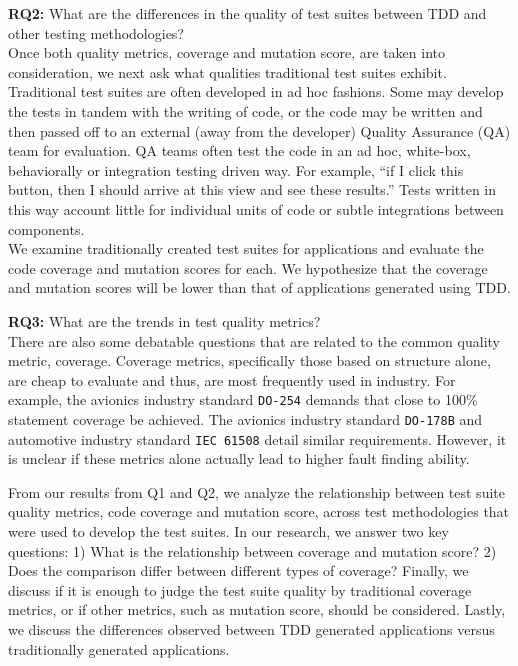 \documentclass[conference]{IEEEtran}
\begin{document}
\textbf{RQ2:} What are the differences in the quality of test suites between TDD and other testing methodologies?\\
Once both quality metrics, coverage and mutation score, are taken into consideration, we next ask what qualities traditional test suites exhibit.  Traditional test suites are often developed in ad hoc fashions. Some may develop the tests in tandem with the writing of code, or the code may be written and then passed off to an external (away from the developer) Quality Assurance (QA) team for evaluation.  QA teams often test the code in an ad hoc, white-box, behaviorally or integration testing driven way.  For example, ``if I click this button, then I should arrive at this view and see these results.''  Tests written in this way account little for individual units of code or subtle integrations between components.\\
We examine traditionally created test suites for applications and evaluate the code coverage and mutation scores for each.  We hypothesize that the coverage and mutation scores will be lower than that of applications generated using TDD.  

\textbf{RQ3:} What are the trends in test quality metrics?\\
There are also some debatable questions that are related to the common quality metric, coverage. Coverage metrics, specifically those based on structure alone, are cheap to evaluate and thus, are most frequently used in industry.  For example, the avionics industry standard \texttt{DO-254} \cite{DO-254} demands that close to 100\% statement coverage be achieved.  The avionics industry standard \texttt{DO-178B} \cite{DO-178B} and automotive industry standard \texttt{IEC 61508} \cite{IEC61508} detail similar requirements. However, it is unclear if these metrics alone actually lead to higher fault finding ability.  

From our results from Q1 and Q2, we analyze the relationship between test suite quality metrics, code coverage and mutation score, across test methodologies that were used to develop the test suites. In our research, we answer two key questions: 1) What is the relationship between coverage and mutation score? 2) Does the comparison differ between different types of coverage? Finally, we discuss if it is enough to judge the test suite quality by traditional coverage metrics, or if other metrics, such as mutation score, should be considered.  Lastly, we discuss the differences observed between TDD generated applications versus traditionally generated applications.  %
\end{document}
